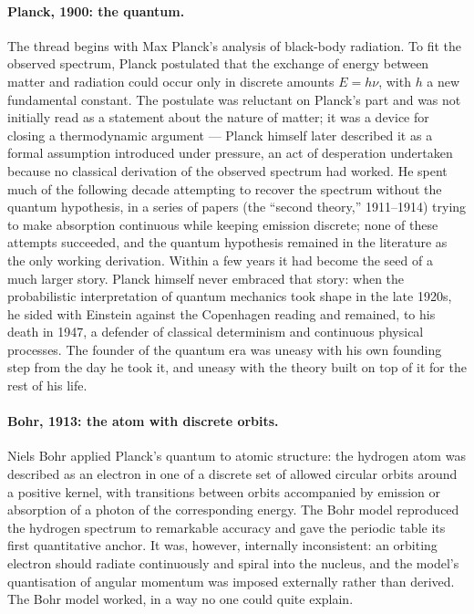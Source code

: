 \paragraph{Planck, 1900: the quantum.}
The thread begins with Max Planck's analysis of black-body radiation. To fit the observed spectrum, Planck postulated that the exchange of energy between matter and radiation could occur only in discrete amounts $E = h\nu$, with $h$ a new fundamental constant. The postulate was reluctant on Planck's part and was not initially read as a statement about the nature of matter; it was a device for closing a thermodynamic argument --- Planck himself later described it as a formal assumption introduced under pressure, an act of desperation undertaken because no classical derivation of the observed spectrum had worked. He spent much of the following decade attempting to recover the spectrum without the quantum hypothesis, in a series of papers (the ``second theory,'' 1911--1914) trying to make absorption continuous while keeping emission discrete; none of these attempts succeeded, and the quantum hypothesis remained in the literature as the only working derivation. Within a few years it had become the seed of a much larger story. Planck himself never embraced that story: when the probabilistic interpretation of quantum mechanics took shape in the late 1920s, he sided with Einstein against the Copenhagen reading and remained, to his death in 1947, a defender of classical determinism and continuous physical processes. The founder of the quantum era was uneasy with his own founding step from the day he took it, and uneasy with the theory built on top of it for the rest of his life.

\paragraph{Bohr, 1913: the atom with discrete orbits.}
Niels Bohr applied Planck's quantum to atomic structure: the hydrogen atom was described as an electron in one of a discrete set of allowed circular orbits around a positive kernel, with transitions between orbits accompanied by emission or absorption of a photon of the corresponding energy. The Bohr model reproduced the hydrogen spectrum to remarkable accuracy and gave the periodic table its first quantitative anchor. It was, however, internally inconsistent: an orbiting electron should radiate continuously and spiral into the nucleus, and the model's quantisation of angular momentum was imposed externally rather than derived. The Bohr model worked, in a way no one could quite explain.

